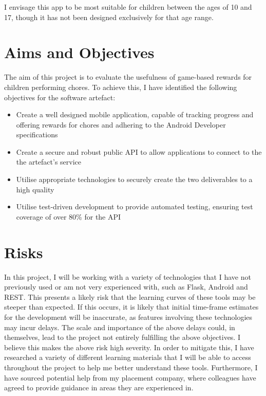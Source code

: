 I envisage this app to be most suitable for children between the ages of 10 and 17, though it has not been designed exclusively for that age range.

\section{Aims and Objectives}
The aim of this project is to evaluate the usefulness of game-based rewards for children performing chores. 
To achieve this, I have identified the following objectives for the software artefact:

\begin{itemize}
	\item Create a well designed mobile application, capable of tracking progress and offering rewards for chores and adhering to the Android Developer specifications
	\item Create a secure and robust public API to allow applications to connect to the the artefact's service
	\item Utilise appropriate technologies to securely create the two deliverables to a high quality
	\item Utilise test-driven development to provide automated testing, ensuring test coverage of over 80\% for the API
\end{itemize}

\section{Risks}
In this project, I will be working with a variety of technologies that I have not previously used or am not very experienced with, such as Flask, Android and REST. 
This presents a likely risk that the learning curves of these tools may be steeper than expected.
If this occurs, it is likely that initial time-frame estimates for the development will be inaccurate, as features involving these technologies may incur delays.
The scale and importance of the above delays could, in themselves, lead to the project not entirely fulfilling the above objectives. I believe this makes the above risk high severity.
In order to mitigate this, I have researched a variety of different learning materials that I will be able to access throughout the project to help me better understand these tools.
Furthermore, I have sourced potential help from my placement company, where colleagues have agreed to provide guidance in areas they are experienced in.

